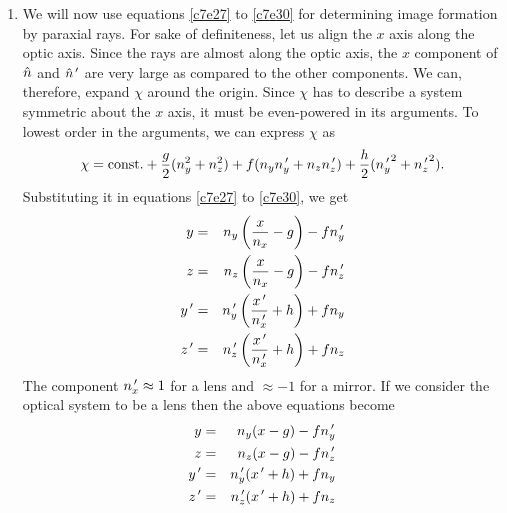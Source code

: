 \begin{enumerate}
\item We will now use equations \eqref{c7e27} to \eqref{c7e30} for determining
image formation by paraxial rays. For sake of definiteness, let us align the $x$
axis along the optic axis. Since the rays are almost along the optic axis, the
$x$ component of $\hat{n}$ and $\hat{n}^{\,\prime}$ are very large as compared to the other
components. We can, therefore, expand $\chi$ around the origin. Since $\chi$ has
to describe a system symmetric about the $x$ axis, it must be even-powered in its
arguments. To lowest order in the arguments, we can express $\chi$ as
\begin{equation}\label{c7e31}
\chi = \text{const.} + \frac{g}{2}(n_y^2 + n_z^2) + f(n_yn_y^{\,\prime}+n_zn_z^{\,\prime})
+ \frac{h}{2}({n_y^{\,\prime}}^2 + {n_z^{\,\prime}}^2).
\end{equation}
Substituting it in equations \eqref{c7e27} to \eqref{c7e30}, we get
\begin{eqnarray*}
y &=& n_y\left(\frac{x}{n_x} - g\right) - fn_y^{\,\prime} \\
z &=& n_z\left(\frac{x}{n_x} - g\right) - fn_z^{\,\prime} \\
y^{\,\prime} &=& n_y^{\,\prime}\left(\frac{x^{\,\prime}}{n_x^{\,\prime}} + h\right) + fn_y \\
z^{\,\prime} &=& n_z^{\,\prime}\left(\frac{x^{\,\prime}}{n_x^{\,\prime}} + h\right) + fn_z
\end{eqnarray*}
The component $n_x^{\,\prime} \approx 1$ for a lens and $\approx -1$ for a 
mirror. If we consider the optical system to be a lens then the above equations 
become
\begin{eqnarray}
y &=& n_y(x - g) - fn_y^{\,\prime} \label{c7e32} \\
z &=& n_z(x - g) - fn_z^{\,\prime} \label{c7e33} \\
y^{\,\prime} &=& n_y^{\,\prime}(x^{\,\prime} + h) + fn_y \label{c7e34} \\
z^{\,\prime} &=& n_z^{\,\prime}(x^{\,\prime} + h) + fn_z \label{c7e35}
\end{eqnarray}


\end{enumerate}
